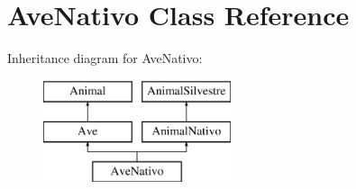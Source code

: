 \hypertarget{class_ave_nativo}{}\section{Ave\+Nativo Class Reference}
\label{class_ave_nativo}
Inheritance diagram for Ave\+Nativo\+:\begin{figure}[H]
\begin{center}
\leavevmode
\includegraphics[height=3.000000cm]{class_ave_nativo}
\end{center}
\end{figure}
